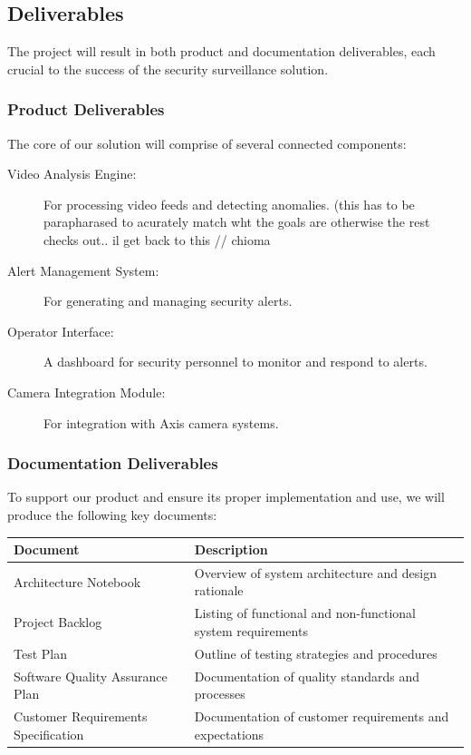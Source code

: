     
\subsection{Deliverables}
The project will result in both product and documentation deliverables, each crucial to the success of the security surveillance solution.
    
\subsubsection{Product Deliverables}
    
The core of our solution will comprise of several connected components:
    
\begin{description}
    \item[Video Analysis Engine:] For processing video feeds and detecting anomalies. (this has to be parapharased to acurately match wht the goals are otherwise the rest checks out.. il get back to this // chioma
    \item[Alert Management System:] For generating and managing security alerts.
    \item[Operator Interface:] A dashboard for security personnel to monitor and respond to alerts.
    \item[Camera Integration Module:] For integration with Axis camera systems.
\end{description}
    
    
\subsubsection{Documentation Deliverables}

To support our product and ensure its proper implementation and use, we will produce the following key documents:

\begin{center}
\begin{tabular}{|p{}|p{}|}
    \hline
    \textbf{Document} & \textbf{Description} \\
    \hline
    Architecture Notebook & Overview of system architecture and design rationale \\
    \hline
    Project Backlog & Listing of functional and non-functional system requirements \\
    \hline
    Test Plan & Outline of testing strategies and procedures \\
    \hline
    Software Quality Assurance Plan & Documentation of quality standards and processes \\
    \hline
    Customer Requirements Specification & Documentation of customer requirements and expectations \\
    \hline
\end{tabular}
\end{center}

